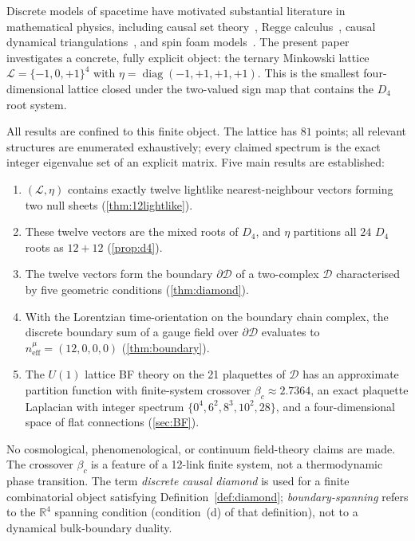 \documentclass[12pt, a4paper]{article}
\theoremstyle{plain}
\theoremstyle{definition}
\theoremstyle{remark}
\newcommand{\Lat}{\mathscr{L}}
\newcommand{\CD}{\mathscr{D}}
\newcommand{\BdyCD}{\partial\mathscr{D}}
\newcommand{\Cstar}{\beta_c}
\newcommand{\neff}{n^\mu_{\mathrm{eff}}}
\newcommand{\R}{\mathbb{R}}
\begin{document}
Discrete models of spacetime have motivated substantial literature
in mathematical physics, including causal set
theory~\cite{Bombelli1987,Henson2006}, Regge
calculus~\cite{Regge1961}, causal dynamical
triangulations~\cite{Ambjorn2004}, and spin foam
models~\cite{Perez2013}.
The present paper investigates a concrete, fully explicit object:
the ternary Minkowski lattice $\Lat = \{-1,0,+1\}^4$ with
$\eta = \operatorname{diag}(-1,+1,+1,+1)$.
This is the smallest four-dimensional lattice closed under the
two-valued sign map that contains the $D_4$ root system.

All results are confined to this finite object.
The lattice has $81$ points; all relevant structures are enumerated
exhaustively; every claimed spectrum is the exact integer eigenvalue
set of an explicit matrix.
Five main results are established:
\begin{enumerate}[label=\textbf{(\roman*)}]
  \item $(\Lat,\eta)$ contains exactly twelve lightlike
    nearest-neighbour vectors forming two null sheets
    (\cref{thm:12lightlike}).
  \item These twelve vectors are the mixed roots of $D_4$, and
    $\eta$ partitions all $24$ $D_4$ roots as $12 + 12$
    (\cref{prop:d4}).
  \item The twelve vectors form the boundary $\BdyCD$ of a
    two-complex $\CD$ characterised by five geometric conditions
    (\cref{thm:diamond}).
  \item With the Lorentzian time-orientation on the boundary chain
    complex, the discrete boundary sum of a gauge field over
    $\BdyCD$ evaluates to $\neff = (12,0,0,0)$
    (\cref{thm:boundary}).
  \item The $U(1)$ lattice BF theory on the 21 plaquettes of $\CD$
    has an approximate partition function with finite-system
    crossover $\Cstar \approx 2.7364$, an exact plaquette
    Laplacian with integer spectrum $\{0^4, 6^2, 8^3, 10^2, 28\}$,
    and a four-dimensional space of flat connections
    (\cref{sec:BF}).
\end{enumerate}

No cosmological, phenomenological, or continuum field-theory claims
are made.
The crossover $\Cstar$ is a feature of a 12-link finite system, not
a thermodynamic phase transition.
The term \emph{discrete causal diamond} is used for a finite
combinatorial object satisfying Definition~\ref{def:diamond};
\emph{boundary-spanning} refers to the $\R^4$ spanning condition
(condition~(d) of that definition), not to a dynamical
bulk-boundary duality.
\end{document}
